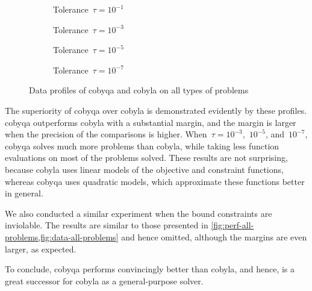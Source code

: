 \begin{figure}[ht]
    \centering
    \begin{subfigure}[b]{0.49\textwidth}
        \centering
        \caption{Tolerance~$\tau = 10^{-1}$}
    \end{subfigure}
    \hfill
    \begin{subfigure}[b]{0.49\textwidth}
        \centering
        \caption{Tolerance~$\tau = 10^{-3}$}
    \end{subfigure}
    \begin{subfigure}[b]{0.49\textwidth}
        \centering
        \caption{Tolerance~$\tau = 10^{-5}$}
    \end{subfigure}
    \hfill
    \begin{subfigure}[b]{0.49\textwidth}
        \centering
        \caption{Tolerance~$\tau = 10^{-7}$}
    \end{subfigure}
    \caption[Data profiles on all problems]{Data profiles of \gls{cobyqa} and \gls{cobyla} on all types of problems}
    \label{fig:data-all-problems}
\end{figure}

The superiority of \gls{cobyqa} over \gls{cobyla} is demonstrated evidently by these profiles.
\Gls{cobyqa} outperforms \gls{cobyla} with a substantial margin, and the margin is larger when the precision of the comparisons is higher.
When~$\tau = 10^{-3}$,~$10^{-5}$, and~$10^{-7}$, \gls{cobyqa} solves much more problems than \gls{cobyla}, while taking less function evaluations on most of the problems solved.
These results are not surprising, because \gls{cobyla} uses linear models of the objective and constraint functions, whereas \gls{cobyqa} uses quadratic models, which approximate these functions better in general.

We also conducted a similar experiment when the bound constraints are inviolable.
The results are similar to those presented in \cref{fig:perf-all-problems,fig:data-all-problems} and hence omitted, although the margins are even larger, as expected.

To conclude, \gls{cobyqa} performs convincingly better than \gls{cobyla}, and hence, is a great successor for \gls{cobyla} as a general-purpose solver.

